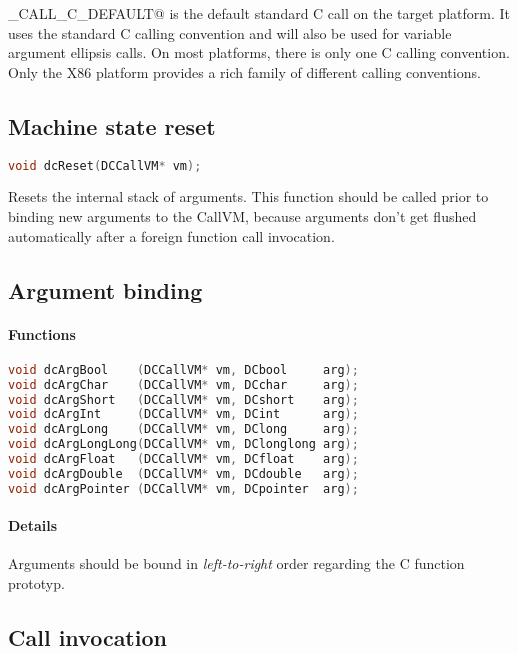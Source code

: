 \lstinline@DC_CALL_C_DEFAULT@ is the default standard C call on the target platform.
It uses the standard C calling convention and will also be used for variable argument ellipsis calls.
On most platforms, there is only one C calling convention. Only the X86 platform
provides a rich family of different calling conventions.


\subsection{Machine state reset}

\begin{lstlisting}[language=c]
void dcReset(DCCallVM* vm);
\end{lstlisting}

Resets the internal stack of arguments. This function should be called prior 
to binding new arguments to the CallVM, because arguments don't get flushed
automatically after a foreign function call invocation.


\subsection{Argument binding}

\paragraph{Functions}

\begin{lstlisting}[language=c]
void dcArgBool    (DCCallVM* vm, DCbool     arg);
void dcArgChar    (DCCallVM* vm, DCchar     arg);
void dcArgShort   (DCCallVM* vm, DCshort    arg);
void dcArgInt     (DCCallVM* vm, DCint      arg);
void dcArgLong    (DCCallVM* vm, DClong     arg);
void dcArgLongLong(DCCallVM* vm, DClonglong arg);
void dcArgFloat   (DCCallVM* vm, DCfloat    arg);
void dcArgDouble  (DCCallVM* vm, DCdouble   arg);
void dcArgPointer (DCCallVM* vm, DCpointer  arg);
\end{lstlisting}

\paragraph{Details}

Arguments should be bound in \emph{left-to-right} order regarding the C function prototyp.

\subsection{Call invocation}

